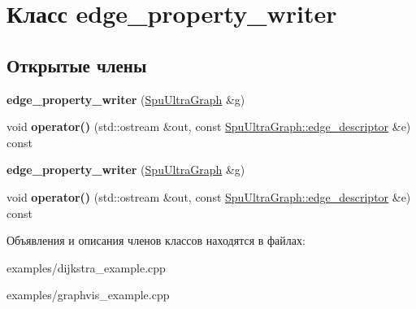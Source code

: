 \hypertarget{classedge__property__writer}{}\section{Класс edge\+\_\+property\+\_\+writer}
\label{classedge__property__writer}
\subsection*{Открытые члены}
\begin{DoxyCompactItemize}
\item 
\mbox{\label{classedge__property__writer_acaadbf3e0c9e0e96847ecff5cd24af54}} 
{\bfseries edge\+\_\+property\+\_\+writer} (\hyperlink{class_s_p_u___g_r_a_p_h_1_1_spu_ultra_graph}{Spu\+Ultra\+Graph} \&g)
\item 
\mbox{\label{classedge__property__writer_a4a8ac776bd83aab3afb64cd3ed9e489c}} 
void {\bfseries operator()} (std\+::ostream \&out, const \hyperlink{class_s_p_u___g_r_a_p_h_1_1_spu_ultra_graph_a5f3776e003ef0a1648f1d9f84289810b}{Spu\+Ultra\+Graph\+::edge\+\_\+descriptor} \&e) const
\item 
\mbox{\label{classedge__property__writer_acaadbf3e0c9e0e96847ecff5cd24af54}} 
{\bfseries edge\+\_\+property\+\_\+writer} (\hyperlink{class_s_p_u___g_r_a_p_h_1_1_spu_ultra_graph}{Spu\+Ultra\+Graph} \&g)
\item 
\mbox{\label{classedge__property__writer_a4a8ac776bd83aab3afb64cd3ed9e489c}} 
void {\bfseries operator()} (std\+::ostream \&out, const \hyperlink{class_s_p_u___g_r_a_p_h_1_1_spu_ultra_graph_a5f3776e003ef0a1648f1d9f84289810b}{Spu\+Ultra\+Graph\+::edge\+\_\+descriptor} \&e) const
\end{DoxyCompactItemize}


Объявления и описания членов классов находятся в файлах\+:\begin{DoxyCompactItemize}
\item 
examples/dijkstra\+\_\+example.\+cpp\item 
examples/graphvis\+\_\+example.\+cpp\end{DoxyCompactItemize}
